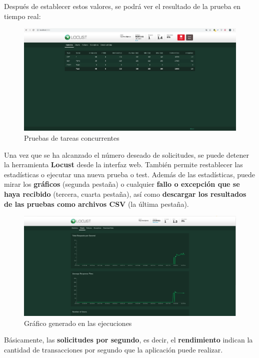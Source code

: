 Después de establecer estos valores, se podrá ver el resultado de la prueba en tiempo real:
\begin{figure}[H]
	\centering
	\includegraphics[scale=0.2]{imagenes/carga/pruebalocust.png}
	\caption{Pruebas de tareas concurrentes} \label{locust_prueba}
\end{figure}

Una vez que se ha alcanzado el número deseado de solicitudes, se puede detener la herramienta \textbf{Locust }desde la interfaz web. También permite restablecer las estadísticas o ejecutar una nueva prueba o test.
Además de las estadísticas, puede mirar los \textbf{gráficos} (segunda pestaña) o cualquier \textbf{fallo o excepción que se haya recibido} (tercera, cuarta pestaña), así como \textbf{descargar los resultados de las pruebas como archivos CSV} (la última pestaña).
\newpage
\begin{figure}[H]
	\centering
	\includegraphics[scale=0.2]{imagenes/carga/charts.png}
	\caption{Gráfico generado en las ejecuciones} \label{locust_chart}
\end{figure}

Básicamente, las\textbf{ solicitudes por segundo}, es decir, el \textbf{rendimiento} indican la cantidad de transacciones por segundo que la aplicación puede realizar.


